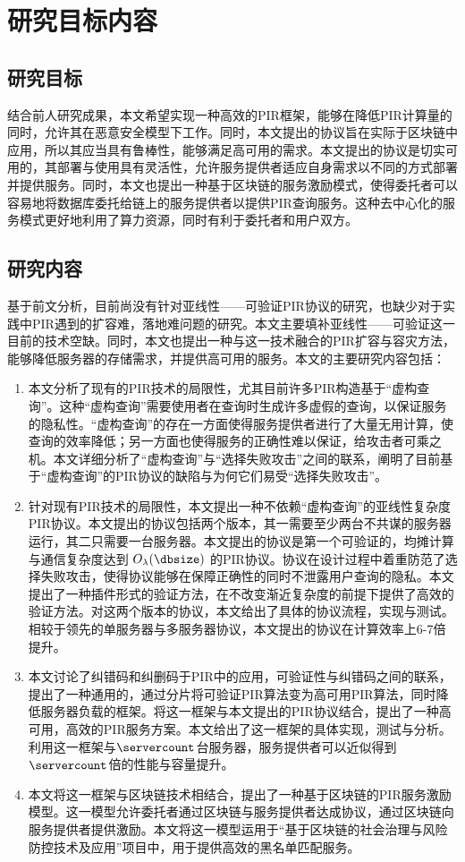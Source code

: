 \section{研究目标内容}

\subsection{研究目标}
结合前人研究成果，本文希望实现一种高效的PIR框架，能够在降低PIR计算量的同时，允许其在恶意安全模型下工作。同时，本文提出的协议旨在实际于区块链中应用，所以其应当具有鲁棒性，能够满足高可用的需求。本文提出的协议是切实可用的，其部署与使用具有灵活性，允许服务提供者适应自身需求以不同的方式部署并提供服务。同时，本文也提出一种基于区块链的服务激励模式，使得委托者可以容易地将数据库委托给链上的服务提供者以提供PIR查询服务。这种去中心化的服务模式更好地利用了算力资源，同时有利于委托者和用户双方。

\subsection{研究内容}

基于前文分析，目前尚没有针对亚线性——可验证PIR协议的研究，也缺少对于实践中PIR遇到的扩容难，落地难问题的研究。本文主要填补亚线性——可验证这一目前的技术空缺。同时，本文也提出一种与这一技术融合的PIR扩容与容灾方法，能够降低服务器的存储需求，并提供高可用的服务。本文的主要研究内容包括：
\begin{enumerate}
    \item 本文分析了现有的PIR技术的局限性，尤其目前许多PIR构造基于“虚构查询”。这种“虚构查询”需要使用者在查询时生成许多虚假的查询，以保证服务的隐私性。“虚构查询”的存在一方面使得服务提供者进行了大量无用计算，使查询的效率降低；另一方面也使得服务的正确性难以保证，给攻击者可乘之机。本文详细分析了“虚构查询”与“选择失败攻击”之间的联系，阐明了目前基于“虚构查询”的PIR协议的缺陷与为何它们易受“选择失败攻击”。
    \item 针对现有PIR技术的局限性，本文提出一种不依赖“虚构查询”的亚线性复杂度PIR协议。本文提出的协议包括两个版本，其一需要至少两台不共谋的服务器运行，其二只需要一台服务器。本文提出的协议是第一个可验证的，均摊计算与通信复杂度达到 $O_\lambda(\dbsize)$ 的PIR协议。协议在设计过程中着重防范了选择失败攻击，使得协议能够在保障正确性的同时不泄露用户查询的隐私。本文提出了一种插件形式的验证方法，在不改变渐近复杂度的前提下提供了高效的验证方法。对这两个版本的协议，本文给出了具体的协议流程，实现与测试。相较于领先的单服务器与多服务器协议，本文提出的协议在计算效率上6-7倍提升。
    \item 本文讨论了纠错码和纠删码于PIR中的应用，可验证性与纠错码之间的联系，提出了一种通用的，通过分片将可验证PIR算法变为高可用PIR算法，同时降低服务器负载的框架。将这一框架与本文提出的PIR协议结合，提出了一种高可用，高效的PIR服务方案。本文给出了这一框架的具体实现，测试与分析。利用这一框架与$\servercount$台服务器，服务提供者可以近似得到$\servercount$倍的性能与容量提升。
    \item 本文将这一框架与区块链技术相结合，提出了一种基于区块链的PIR服务激励模型。这一模型允许委托者通过区块链与服务提供者达成协议，通过区块链向服务提供者提供激励。本文将这一模型运用于“基于区块链的社会治理与风险防控技术及应用”项目中，用于提供高效的黑名单匹配服务。
\end{enumerate}
